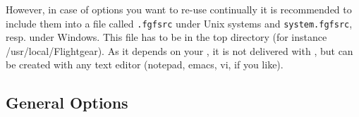 However, in case of options you want to re-use continually it is recommended to include them into a file called
\texttt{.fgfsrc} under Unix systems and
\texttt{system.fgfsrc}, resp. under Windows. This file has to be in
the top \FlightGear{} directory (for instance /usr/local/Flightgear). As it depends on your
, it is not delivered with \FlightGear{}$\!$, but can be created with
any text editor (notepad, emacs, vi, if you like). 

\subsection{General Options}\label{generaloptions}
